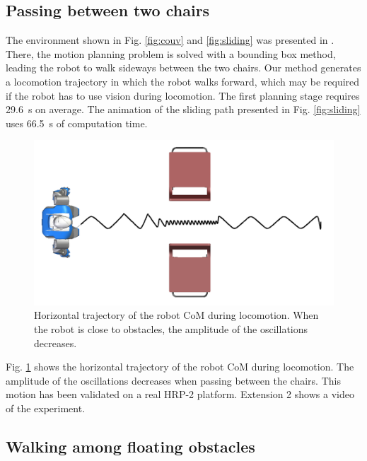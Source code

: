 \documentclass{article}
\begin{document}
\subsection{Passing between two chairs}
\label{sec:chairs}

The environment shown in Fig. \ref{fig:couv} and \ref{fig:sliding} was presented
in \cite{el2011path}. There, the motion planning problem is solved with a bounding
box method, leading the robot to walk sideways between the two chairs.
Our method generates a locomotion  trajectory in which the robot walks
forward, which may be required if the robot has to use vision during
locomotion. The first planning stage  requires 29.6~s
on  average.   The  animation  of   the  sliding  path   presented  in
Fig.   \ref{fig:sliding}   uses  66.5~s  of  computation   time.


\begin{figure}[h!]
\centering
\includegraphics[width=0.7\linewidth]{pics/chairs/waist-trajectory.png}

\caption{Horizontal trajectory of the robot CoM during
  locomotion. When the robot is close to obstacles, the amplitude of
  the oscillations decreases.}
\label{fig:chairs-waist}
\end{figure}



Fig.  \ref{fig:chairs-waist} shows  the horizontal  trajectory  of the
robot CoM  during  locomotion. The amplitude of the oscillations  decreases when passing
between the  chairs.  This motion has  been validated on  a real HRP-2
platform. Extension 2 shows a video of the experiment.


\subsection{Walking among floating obstacles}
\end{document}
